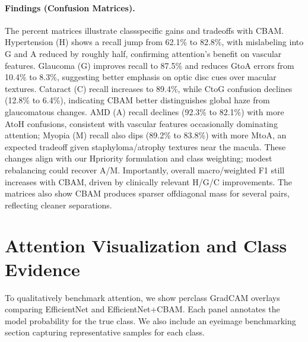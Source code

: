\paragraph{Findings (Confusion Matrices).}
The percent matrices illustrate class\textendash specific gains and trade\textendash offs with CBAM. Hypertension (H) shows a recall jump from 62.1\% to 82.8\%, with mislabeling into G and A reduced by roughly half, confirming attention’s benefit on vascular features. Glaucoma (G) improves recall to 87.5\% and reduces G\textendash to\textendash A errors from 10.4\% to 8.3\%, suggesting better emphasis on optic disc cues over macular textures. Cataract (C) recall increases to 89.4\%, while C\textendash to\textendash G confusion declines (12.8\% to 6.4\%), indicating CBAM better distinguishes global haze from glaucomatous changes. AMD (A) recall declines (92.3\% to 82.1\%) with more A\textendash to\textendash H confusions, consistent with vascular features occasionally dominating attention; Myopia (M) recall also dips (89.2\% to 83.8\%) with more M\textendash to\textendash A, an expected trade\textendash off given staphyloma/atrophy textures near the macula. These changes align with our H\textendash priority formulation and class weighting; modest rebalancing could recover A/M. Importantly, overall macro/weighted F1 still increases with CBAM, driven by clinically relevant H/G/C improvements. The matrices also show CBAM produces sparser off\textendash diagonal mass for several pairs, reflecting cleaner separations.

\section{Attention Visualization and Class Evidence}
To qualitatively benchmark attention, we show per\textendash class Grad\textendash CAM overlays comparing EfficientNet and EfficientNet+CBAM. Each panel annotates the model probability for the true class. We also include an eye\textendash image benchmarking section capturing representative samples for each class.

